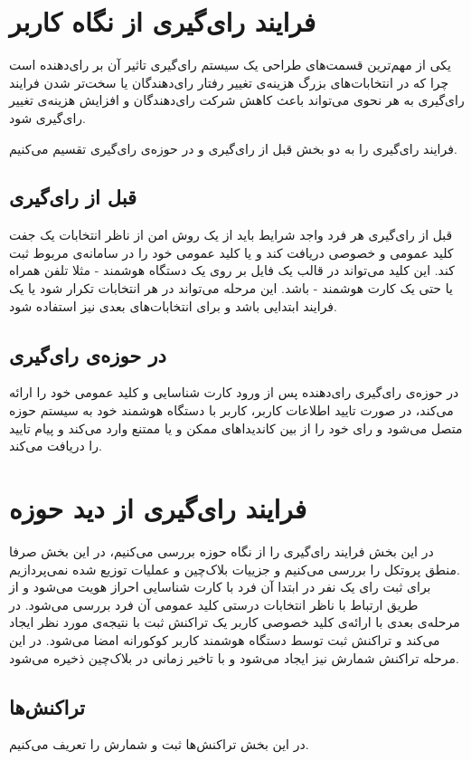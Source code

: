 \section{فرایند رای‌گیری از نگاه کاربر}
یکی از مهم‌ترین قسمت‌های طراحی یک سیستم رای‌گیری تاثیر آن بر رای‌دهنده است چرا که در انتخابات‌های بزرگ هزینه‌ی تغییر رفتار رای‌دهندگان یا سخت‌تر شدن فرایند رای‌گیری به هر نحوی می‌تواند باعث کاهش شرکت رای‌دهندگان و افزایش هزینه‌ی تغییر رای‌گیری شود.
\par
فرایند رای‌گیری را به دو بخش قبل از رای‌گیری و در حوزه‌ی رای‌گیری تقسیم می‌کنیم. 
\subsection{قبل از رای‌گیری}
قبل از رای‌گیری هر فرد واجد شرایط باید از یک روش امن از ناظر انتخابات یک جفت کلید عمومی و خصوصی دریافت کند و یا کلید عمومی خود را در سامانه‌ی مربوط ثبت کند. این کلید می‌تواند در قالب یک فایل بر روی یک دستگاه هوشمند - مثلا تلفن همراه یا حتی یک کارت هوشمند - باشد. این مرحله  می‌تواند در هر انتخابات تکرار شود یا یک فرایند ابتدایی باشد و برای انتخابات‌های بعدی نیز استفاده شود. 
\subsection{در حوزه‌ی رای‌گیری}
در حوزه‌ی رای‌گیری رای‌دهنده پس از ورود کارت شناسایی و کلید عمومی خود را ارائه می‌کند، در صورت تایید اطلاعات کاربر، کاربر با دستگاه هوشمند خود به سیستم‌ حوزه متصل می‌شود و رای‌ خود را از بین‌ کاندیدا‌های ممکن و یا ممتنع وارد می‌کند و پیام تایید را دریافت می‌کند. 
\section{فرایند رای‌گیری از دید حوزه‌}
در این بخش فرایند رای‌گیری را از نگاه حوزه‌ بررسی می‌کنیم، در این بخش صرفا منطق پروتکل را بررسی می‌کنیم و جزییات بلاک‌چین و عملیات توزیع شده نمی‌پردازیم. 
\\
برای ثبت رای یک‌ نفر در ابتدا آن فرد با کارت شناسایی احراز هویت می‌شود و از طریق ارتباط با ناظر انتخابات درستی کلید عمومی آن فرد بررسی می‌شود. در مرحله‌ی بعدی با ارائه‌ی کلید خصوصی کاربر یک تراکنش ثبت با نتیجه‌ی مورد نظر ایجاد می‌کند و تراکنش ثبت توسط دستگاه هوشمند کاربر کوکورانه امضا می‌شود. در این مرحله تراکنش شمارش نیز ایجاد می‌شود و با تاخیر زمانی در بلاک‌چین ذخیره می‌شود.

\subsection{تراکنش‌ها}
در این بخش تراکنش‌ها ثبت و شمارش را تعریف می‌کنیم.
